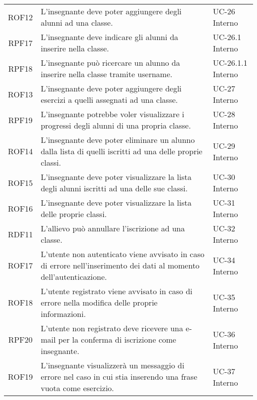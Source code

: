 \begin{tabularx}{\textwidth}{| c | p{10cm} | X |}
		ROF12 & L'insegnante deve poter aggiungere degli alunni ad una classe. & UC-26 \newline Interno\\
		RPF17 & L'insegnante deve indicare gli alunni da inserire nella classe. & UC-26.1 \newline Interno\\
		RPF18 & L'insegnante può ricercare un alunno da inserire nella classe tramite username. & UC-26.1.1 \newline Interno\\
		ROF13 & L'insegnante deve poter aggiungere degli esercizi a quelli assegnati ad una classe. & UC-27 \newline Interno\\
		RPF19 & L'insegnante potrebbe voler visualizzare i progressi degli alunni di una propria classe. & UC-28 \newline Interno\\
		ROF14 & L'insegnante deve poter eliminare un alunno dalla lista di quelli iscritti ad una delle proprie classi. & UC-29 \newline Interno\\
		ROF15 & L'insegnante deve poter visualizzare la lista degli alunni iscritti ad una delle sue classi. & UC-30 \newline Interno\\
		ROF16 & L'insegnante deve poter visualizzare la lista delle proprie classi. & UC-31 \newline Interno\\
		RDF11 & L'allievo può annullare l'iscrizione ad una classe. & UC-32 \newline Interno\\
		ROF17 & L'utente non autenticato viene avvisato in caso di errore nell'inserimento dei dati al momento dell'autenticazione. & UC-34 \newline Interno\\
		ROF18 & L'utente registrato viene avvisato in caso di errore nella modifica delle proprie informazioni. & UC-35 \newline Interno\\
		RPF20 & L'utente non registrato deve ricevere una e-mail per la conferma di iscrizione come insegnante. & UC-36 \newline Interno\\
		ROF19 & L'insegnante visualizzerà un messaggio di errore nel caso in cui stia inserendo una frase vuota come esercizio. & UC-37 \newline Interno\\

\end{tabularx}
